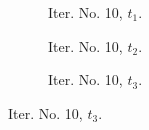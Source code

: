 \documentclass[a4paper,12pt]{amsart}
\numberwithin{equation}{section}
\begin{document}
\begin{figure}[h!]
\begin{subfigure}[t]{0.23\textwidth}
    \caption{Iter. No. 10, $t_1$.}
\end{subfigure}
	\hfill
\begin{subfigure}[t]{0.23\textwidth}
    \caption{Iter. No. 10, $t_2$.}
\end{subfigure}
	\hfill
\begin{subfigure}[t]{0.23\textwidth}
    \caption{Iter. No. 10, $t_3$.}
\end{subfigure}



\end{figure}
\end{document}
